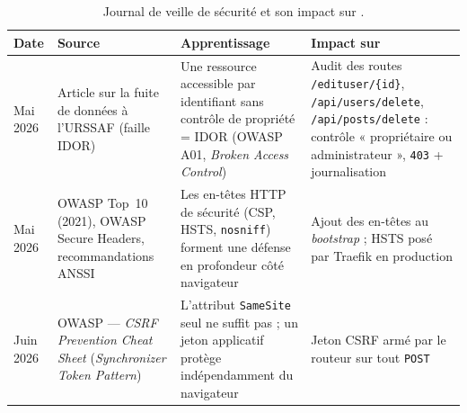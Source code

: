 \begin{table}[ht]
\centering
\renewcommand{\arraystretch}{1.4}
\small
\begin{tabularx}{\textwidth}{@{}L{1.5cm} L{3cm} X X@{}}
\toprule
\textbf{Date} & \textbf{Source} & \textbf{Apprentissage} & \textbf{Impact sur \projet{}} \\
\midrule
Mai 2026 & Article sur la fuite de données à l'URSSAF (faille IDOR) & Une ressource accessible par identifiant sans contrôle de propriété = IDOR (OWASP A01, \emph{Broken Access Control}) & Audit des routes \texttt{/edituser/\{id\}}, \texttt{/api/users/delete}, \texttt{/api/posts/delete} : contrôle « propriétaire ou administrateur », \texttt{403} + journalisation \\
Mai 2026 & OWASP Top~10 (2021), OWASP Secure Headers, recommandations ANSSI & Les en-têtes HTTP de sécurité (CSP, HSTS, \texttt{nosniff}) forment une défense en profondeur côté navigateur & Ajout des en-têtes au \emph{bootstrap} ; HSTS posé par Traefik en production \\
Juin 2026 & OWASP — \emph{CSRF Prevention Cheat Sheet} (\emph{Synchronizer Token Pattern}) & L'attribut \texttt{SameSite} seul ne suffit pas ; un jeton applicatif protège indépendamment du navigateur & Jeton CSRF armé par le routeur sur tout \texttt{POST} \\
\bottomrule
\end{tabularx}
\caption{Journal de veille de sécurité et son impact sur \projet{}.}
\label{tab:veille}
\end{table}
